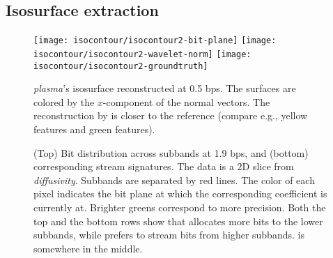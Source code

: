 \subsection{Isosurface extraction}\label{sec:isocontour}

\begin{figure}[t]
\centering
{}
{\texttt{[image: isocontour/isocontour2-bit-plane]}}
{\texttt{[image: isocontour/isocontour2-wavelet-norm]}}
{\texttt{[image: isocontour/isocontour2-groundtruth]}}
\caption{\emph{plasma}'s isosurface reconstructed at 0.5 bps. The surfaces are colored by the
$x$-component of the normal vectors. The reconstruction by \sbit is closer to the reference (compare
e.g., yellow features and green features).}
\label{fig:isocontour-surfaces-plasma}
\end{figure}

\begin{figure}[t]
\centering
\caption{(Top) Bit distribution across subbands at 1.9 bps, and (bottom) corresponding stream
signatures. The data is a 2D slice from \emph{diffusivity}. Subbands are separated by red lines. The
color of each pixel indicates the bit plane at which the corresponding coefficient is currently at.
Brighter greens correspond to more precision. Both the top and the bottom rows show that \shsg
allocates more bits to the lower subbands, while \slsg prefers to stream bits from higher subbands.
\ssig is somewhere in the middle.}
\label{fig:bit-distrib}
\end{figure}

